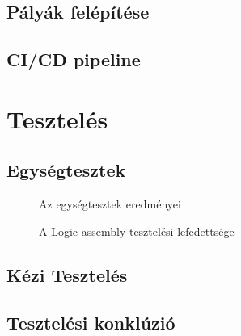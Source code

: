 \subsection{Pályák felépítése}

\subsection{CI/CD pipeline}

\cleardoublepage
\section{Tesztelés}

\subsection{Egységtesztek}

\begin{figure}[H]
	\noindent{}
	\caption{Az egységtesztek eredményei}
	\label{tests}
\end{figure}

\begin{figure}[H]
	\noindent{}
	\caption{A Logic assembly tesztelési lefedettsége}
	\label{codeCoverage}
\end{figure}


\subsection{Kézi Tesztelés}

\subsection{Tesztelési konklúzió}